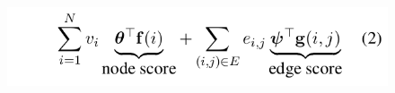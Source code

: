 \documentclass[xcolor={table}]{beamer}
\begin{document}
\begin{frame}{\cite{liu2015toward}}
\begin{figure}[h]
\centering
\includegraphics[scale=.25]{images/math2-liu15} \\
\end{figure}
\end{frame}











\end{document}
